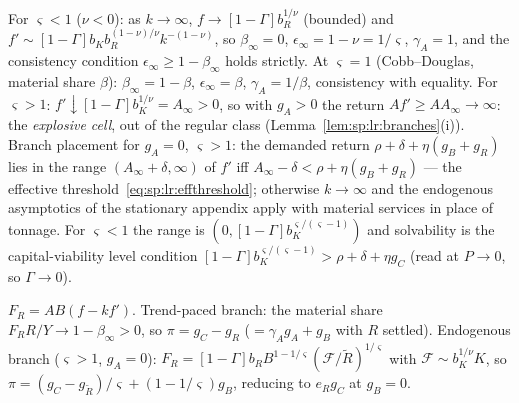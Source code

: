  For $\varsigma<1$ ($\nu<0$): as $k\to\infty$,
$f\to\left[1-\Gamma\right]b_R^{1/\nu}$ (bounded) and
$f'\sim\left[1-\Gamma\right]b_Kb_R^{\left(1-\nu\right)/\nu}k^{-\left(1-\nu\right)}$, so
$\beta_\infty=0$, $\epsilon_\infty=1-\nu=1/\varsigma$, $\gamma_A=1$, and the consistency
condition $\epsilon_\infty\ge1-\beta_\infty$ holds strictly. At $\varsigma=1$ (Cobb--Douglas,
material share $\beta$): $\beta_\infty=1-\beta$, $\epsilon_\infty=\beta$,
$\gamma_A=1/\beta$, consistency with equality. For $\varsigma>1$:
$f'\downarrow\left[1-\Gamma\right]b_K^{1/\nu}=A_\infty>0$, so with $g_A>0$ the return
$Af'\ge AA_\infty\to\infty$: the \emph{explosive cell}, out of the regular class
(Lemma~\ref{lem:sp:lr:branches}(i)). Branch placement for $g_A=0$, $\varsigma>1$: the
demanded return $\rho+\delta+\eta\left(g_B+g_R\right)$ lies in the range
$\left(A_\infty+\delta,\infty\right)$ of $f'$ iff
$A_\infty-\delta<\rho+\eta\left(g_B+g_R\right)$ --- the effective
threshold~\eqref{eq:sp:lr:effthreshold}; otherwise $k\to\infty$ and the endogenous
asymptotics of the stationary appendix apply with material services in place of tonnage.
For $\varsigma<1$ the range is $\left(0,\left[1-\Gamma\right]b_K^{\varsigma/\left(\varsigma-1\right)}\right)$
and solvability is the capital-viability level condition
$\left[1-\Gamma\right]b_K^{\varsigma/\left(\varsigma-1\right)}>\rho+\delta+\eta g_C$
(read at $P\to0$, so $\Gamma\to0$).

 $F_R=AB\left(f-kf'\right)$. Trend-paced branch: the
material share $F_RR/Y\to1-\beta_\infty>0$, so $\pi=g_C-g_R$ ($=\gamma_Ag_A+g_B$ with $R$
settled). Endogenous branch ($\varsigma>1$, $g_A=0$):
$F_R=\left[1-\Gamma\right]b_RB^{1-1/\varsigma}\left(\mathcal F/\tilde R\right)^{1/\varsigma}$
with $\mathcal F\sim b_K^{1/\nu}K$, so
$\pi=\left(g_C-g_{\tilde R}\right)/\varsigma+\left(1-1/\varsigma\right)g_B$, reducing to
$e_Rg_C$ at $g_B=0$.

